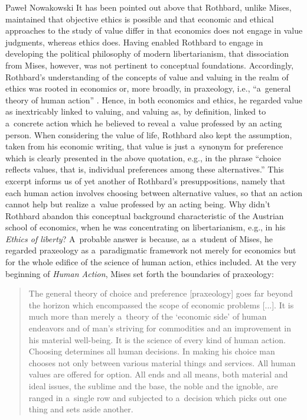 \begin{artengenv}{Paweł Nowakowski}
It has been pointed out above that Rothbard, unlike Mises, maintained that objective ethics is possible and that economic and ethical approaches to the study of value differ in that economics does not engage in value judgments, whereas ethics does. Having enabled Rothbard to engage in developing the political philosophy of modern libertarianism, that dissociation from Mises, however, was not pertinent to conceptual foundations. Accordingly, Rothbard's understanding of the concepts of value and valuing in the realm of ethics was rooted in economics or, more broadly, in praxeology, i.e., ``a~general theory of human action'' 
\parencite[][p.7]{Mises2008Human}. %
 Hence, in both economics and ethics, he regarded value as inextricably linked to valuing, and valuing as, by definition, linked to a~concrete action which he believed to reveal a~value professed by an acting person. When considering the value of life, Rothbard also kept the assumption, taken from his economic writing, that value is just a~synonym for preference which is clearly presented in the above quotation, e.g., in the phrase ``choice reflects values, that is, individual preferences among these alternatives.'' This excerpt informs us of yet another of Rothbard's presuppositions, namely that each human action involves choosing between alternative values, so that an action cannot help but realize a~value professed by an acting being. Why didn't Rothbard abandon this conceptual background characteristic of the Austrian school of economics, when he was concentrating on libertarianism, e.g., in his \textit{Ethics of liberty}? A~probable answer is because, as a~student of Mises, he regarded praxeology as a~paradigmatic framework not merely for economics but for the whole edifice of the science of human action, ethics included. At the very beginning of \textit{Human Action}, Mises 
\parencite*[][p.3]{Mises2008Human} %
 set forth the boundaries of praxeology:

\begin{quote}
The general theory of choice and preference [praxeology] goes far beyond the horizon which encompassed the scope of economic problems [...]. It is much more than merely a~theory of the ‘economic side' of human endeavors and of man's striving for commodities and an improvement in his material well-being. It is the science of every kind of human action. Choosing determines all human decisions. In making his choice man chooses not only between various material things and services. All human values are offered for option. All ends and all means, both material and ideal issues, the sublime and the base, the noble and the ignoble, are ranged in a~single row and subjected to a~decision which picks out one thing and sets aside another.
\end{quote}




\end{artengenv}
